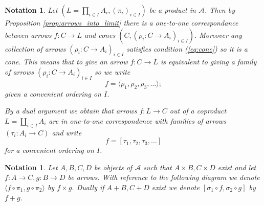 \documentclass[letterpaper, 11pt, oneside]{memoir}
\theoremstyle{myteo}
\newtheorem{notation}[theorem]{Notation}
\numberwithin{equation}{section}
\newcommand{\marginnote}[1]{\marginpar{\footnotesize #1}}
\newcommand{\A}{\mathscr{A}}
\begin{document}
\begin{notation}
  \label{not:brackets}
  Let \((L = \prod_{i\in I}A_i, (\pi_i)_{i \in I})\) be a product in \(\A\).
  Then by Proposition \ref{prop:arrows_into_limit} there is a one-to-one correspondance between arrows \(f \colon C \to L\) and cones \((C, (\rho_i\colon C \to A_i)_{i \in I})\).
  Moreover any collection of arrows \((\rho_i \colon C \to A_i)_{i \in I}\) satisfies condition (\ref{eq:cone}) so it is a cone.
  This means that to give an arrow \(f \colon C \to L\) is equivalent to giving a family of arrows \((\rho_i \colon C \to A_i)_{i \in I}\) so we write
  \begin{equation}
    f = \langle\rho_1, \rho_2, \rho_3, \ldots\rangle;
  \end{equation}
  given a convenient ordering on \(I\).

  By a dual argument we obtain that arrows \(f \colon L \to C\) out of a coproduct \(L = \coprod_{i \in I}A_i\) are in one-to-one correspondence with families of arrows \((\tau_i \colon A_i \to C)\) and write
  \begin{equation}
    f = [\tau_1, \tau_2, \tau_3, \ldots]
  \end{equation}
  for a convenient ordering on \(I\).
\end{notation}

\begin{notation}
  \label{not:product_arrows}
  Let \(A,B,C,D\) be objects of \(\A\) such that \(A \times B, C \times D\) exist and let \(f \colon A \to C, g \colon B \to D\) be arrows.
  With reference to the following diagram we denote \(\langle f \circ \pi_1, g \circ \pi_2\rangle\) by \(f \times g\).
  Dually if \(A + B, C + D\) exist we denote \([\sigma_1 \circ f, \sigma_2 \circ g]\) by \(f + g\).
  \marginnote{\(f \times g\), \(f + g\)}
  \begin{center}
    \quad
  \end{center}
\end{notation}
\end{document}
